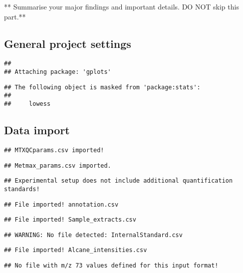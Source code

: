 \documentclass[9pt,]{article}
\begin{document}
** Summarise your major findings and important details. DO NOT skip this
part.**

\subsection{General project settings}\label{general-project-settings}

\begin{verbatim}
## 
## Attaching package: 'gplots'
\end{verbatim}

\begin{verbatim}
## The following object is masked from 'package:stats':
## 
##     lowess
\end{verbatim}

\subsection{Data import}\label{data-import}

\begin{verbatim}
## MTXQCparams.csv imported!
\end{verbatim}

\begin{verbatim}
## Metmax_params.csv imported.
\end{verbatim}

\begin{verbatim}
## Experimental setup does not include additional quantification standards!
\end{verbatim}

\begin{verbatim}
## File imported! annotation.csv
\end{verbatim}

\begin{verbatim}
## File imported! Sample_extracts.csv
\end{verbatim}

\begin{verbatim}
## WARNING: No file detected: InternalStandard.csv
\end{verbatim}

\begin{verbatim}
## File imported! Alcane_intensities.csv
\end{verbatim}

\begin{verbatim}
## No file with m/z 73 values defined for this input format!
\end{verbatim}
\end{document}
